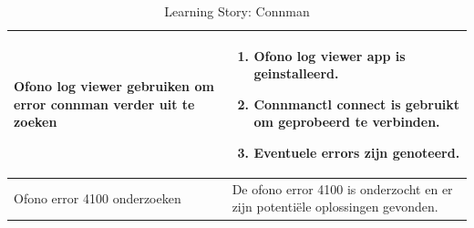 \documentclass[a4paper]{report}
\begin{document}
\begin{tcolorbox}
\begin{table}[H]
\begin{tabularx}{1\textwidth}{|X|X|}
      \hline
      Ofono log viewer gebruiken om error connman verder uit te zoeken & 
      \begin{enumerate}[leftmargin=.4cm, topsep=0cm, itemsep=.2cm]
        \item Ofono log viewer app is geinstalleerd.
        \item Connmanctl connect is gebruikt om geprobeerd te verbinden.
        \item Eventuele errors zijn genoteerd.
      \end{enumerate} \\
      \hline
      Ofono error 4100 onderzoeken & De ofono error 4100 is onderzocht en er zijn potentiële oplossingen gevonden. \\
      \hline
    \end{tabularx}
    \caption{Learning Story: Connman}
  \label{table:it4:story_connman}
  \end{table}
  \end{tcolorbox}
\end{document}
